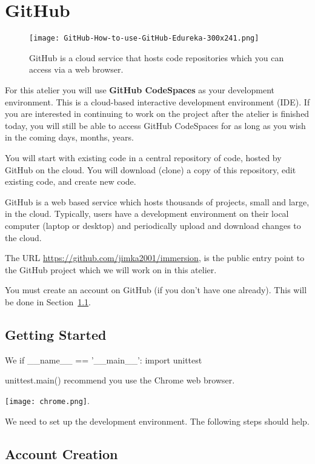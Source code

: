 \section{GitHub}
\label{sec.github}

\begin{figure}[h]
  \centering
  \texttt{[image: GitHub-How-to-use-GitHub-Edureka-300x241.png]}
  \caption{GitHub is a cloud service that hosts code repositories which 
    you can access via a web browser.}
\end{figure}

For this atelier you will use \textbf{GitHub CodeSpaces} as your
development environment.  This is a cloud-based interactive
development environment (IDE).  If you are interested in continuing to
work on the project after the atelier is finished today, you will
still be able to access GitHub CodeSpaces for as long as you wish in
the coming days, months, years.


You will start with existing code in a central repository of code, hosted by
GitHub on the cloud.  You will download (clone) a copy of this
repository, edit existing code, and create new code.

GitHub is a web based service which hosts thousands of projects, small
and large, in the cloud.  Typically, users have a development
environment on their local computer (laptop or desktop) and
periodically upload and download changes to the cloud.

The URL \url{https://github.com/jimka2001/immersion}, is the public
entry point to the GitHub project which we will work on in this
atelier.

You must create an account on GitHub (if you don't have one already).
This will be done in Section~\ref{sec.setup}.


\subsection{Getting Started}
\label{sec.setup}

We if __name__ == '__main__':
    import unittest

    unittest.main()
recommend you use the Chrome web browser.

\texttt{[image: chrome.png]}.

We need to set up the development environment.  The following steps should
help.

\subsection{Account Creation}
  
